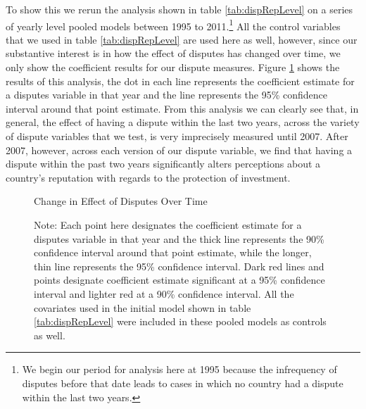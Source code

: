 \documentclass[12pt,onesided]{amsart}
\begin{document}
To show this we rerun the analysis shown in table \ref{tab:dispRepLevel} on a series of yearly level pooled models between 1995 to 2011.\footnote{We begin our period for analysis here at 1995 because the infrequency of disputes before that date leads to cases in which no country had a dispute within the last two years.} All the control variables that we used in table \ref{tab:dispRepLevel} are used here as well, however, since our substantive interest is in how the effect of disputes has changed over time, we only show the coefficient results for our dispute measures. Figure \ref{fig:dispEffectYear} shows the results of this analysis, the dot in each line represents the coefficient estimate for a disputes variable in that year and the line represents the 95\% confidence interval around that point estimate. From this analysis we can clearly see that, in general, the effect of having a dispute within the last two years, across the variety of dispute variables that we test, is very imprecisely measured until 2007. After 2007, however, across each version of our dispute variable, we find that having a dispute within the past two years significantly alters perceptions about a country's reputation with regards to the protection of investment.

\begin{figure}[ht]
	\vspace{4cm}
	\centering
	\caption{Change in Effect of Disputes Over Time}
	\label{fig:dispEffectYear}
	\resizebox{1\textwidth}{!}{}
	\caption*{Note: Each point here designates the coefficient estimate for a disputes variable in that year and the thick line represents the 90\% confidence interval around that point estimate, while the longer, thin line represents the 95\% confidence interval. Dark red lines and points designate coefficient estimate significant at a 95\% confidence interval and lighter red at a 90\% confidence interval. All the covariates used in the initial model shown in table \ref{tab:dispRepLevel} were included in these pooled models as controls as well.}
\end{figure}
\end{document}
